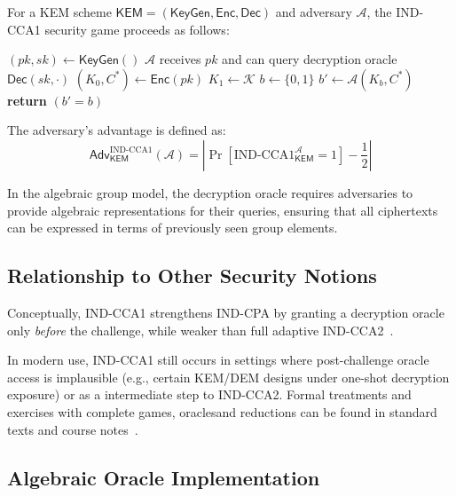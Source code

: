 \begin{definition}
\label{def:ind-cca1-game}
For a KEM scheme $\mathsf{KEM} = (\mathsf{KeyGen}, \mathsf{Enc}, \mathsf{Dec})$ and adversary $\mathcal{A}$, the IND-CCA1 security game proceeds as follows:

\begin{algorithmic}[1]
\STATE $(pk, sk) \leftarrow \mathsf{KeyGen}()$ 
\STATE $\mathcal{A}$ receives $pk$ and can query decryption oracle $\mathsf{Dec}(sk, \cdot)$
\STATE $(K_0, C^*) \leftarrow \mathsf{Enc}(pk)$ 
\STATE $K_1 \leftarrow \mathcal{K}$ 
\STATE $b \leftarrow \{0,1\}$ 
\STATE $b' \leftarrow \mathcal{A}(K_b, C^*)$ 
\STATE \textbf{return} $(b' = b)$ 
\end{algorithmic}
\end{definition}

The adversary's advantage is defined as:
\[
\mathsf{Adv}^{\text{IND-CCA1}}_{\mathsf{KEM}}(\mathcal{A}) = \left| \Pr[\text{IND-CCA1}^{\mathcal{A}}_{\mathsf{KEM}} = 1] - \frac{1}{2} \right|
\]

In the algebraic group model, the decryption oracle requires adversaries to provide algebraic representations for their queries, ensuring that all ciphertexts can be expressed in terms of previously seen group elements.

\subsection{Relationship to Other Security Notions}

Conceptually, IND-CCA1 strengthens IND-CPA by granting a decryption oracle only \emph{before} the challenge, while weaker than full adaptive IND-CCA2~\cite{fuchsbauer2018}.

In modern use, IND-CCA1 still occurs in settings where post-challenge oracle access is implausible (e.g., certain KEM/DEM designs under one-shot decryption exposure) or as a intermediate step to IND-CCA2. Formal treatments and exercises with complete games, oraclesand reductions can be found in standard texts and course notes~\cite{katzlindell-2nd,princeton-cramershoup}.

\subsection{Algebraic Oracle Implementation}

